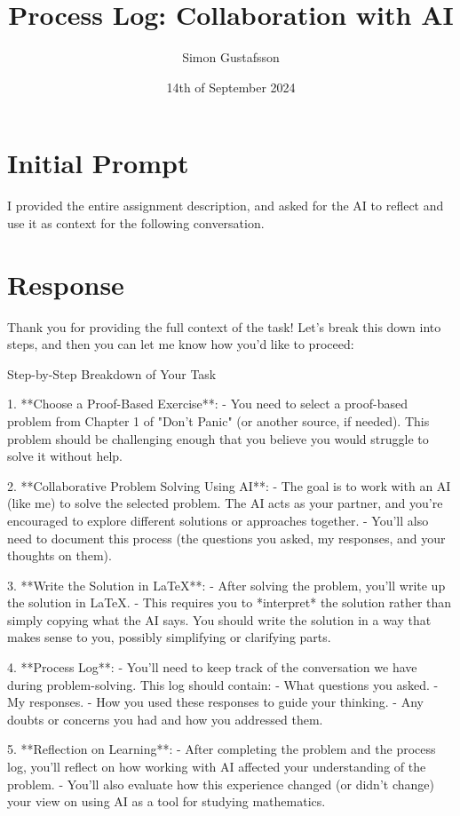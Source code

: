 \documentclass{article}
\title{Process Log: Collaboration with AI}
\author{Simon Gustafsson}
\date{14th of September 2024}
\begin{document}
\maketitle

\section*{Initial Prompt}

I provided the entire assignment description, and asked for the AI to reflect and use it as context for the following conversation.

\section*{Response}
Thank you for providing the full context of the task! Let's break this down into steps, and then you can let me know how you'd like to proceed:

Step-by-Step Breakdown of Your Task

1. **Choose a Proof-Based Exercise**:
   - You need to select a proof-based problem from Chapter 1 of "Don't Panic" (or another source, if needed). This problem should be challenging enough that you believe you would struggle to solve it without help.

2. **Collaborative Problem Solving Using AI**:
   - The goal is to work with an AI (like me) to solve the selected problem. The AI acts as your partner, and you're encouraged to explore different solutions or approaches together.
   - You'll also need to document this process (the questions you asked, my responses, and your thoughts on them).

3. **Write the Solution in LaTeX**:
   - After solving the problem, you'll write up the solution in LaTeX.
   - This requires you to *interpret* the solution rather than simply copying what the AI says. You should write the solution in a way that makes sense to you, possibly simplifying or clarifying parts.

4. **Process Log**:
   - You'll need to keep track of the conversation we have during problem-solving. This log should contain:
     - What questions you asked.
     - My responses.
     - How you used these responses to guide your thinking.
     - Any doubts or concerns you had and how you addressed them.

5. **Reflection on Learning**:
   - After completing the problem and the process log, you'll reflect on how working with AI affected your understanding of the problem.
   - You'll also evaluate how this experience changed (or didn't change) your view on using AI as a tool for studying mathematics.
\end{document}

